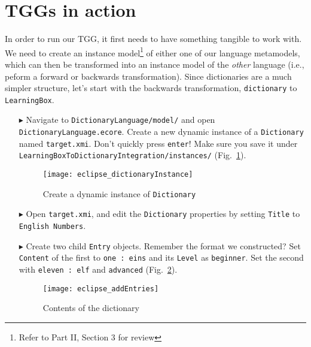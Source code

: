 \newpage
\section{TGGs in action}
\genHeader
\label{sect:TGGs_in_Action}

In order to run our TGG, it first needs to have something tangible to work with. We need to create an instance model\footnote{Refer to Part II, Section 3 for
review} of either one of our language metamodels, which can then be transformed into an instance model of the \emph{other} language (i.e., peform a forward or
backwards transformation). Since dictionaries are a much simpler structure, let's start with the backwards transformation, \texttt{dictionary} to
\texttt{LearningBox}.

\begin{itemize}

\item[$\blacktriangleright$] Navigate to \texttt{Dictionary\-Language/model/} and open \texttt{DictionaryLanguage.ecore}. Create a new
dynamic instance of a \texttt{Dictionary} named \texttt{target.xmi}. Don't quickly press \texttt{enter}! Make sure you save it under
\texttt{Learn\-ing\-Box\-To\-Dictionary\-In\-te\-gra\-tion/in\-stan\-ces/} (Fig.~\ref{fig:create_instance_dict}).

\begin{figure}[htbp]
\begin{center}
  \texttt{[image: eclipse\_dictionaryInstance]}
  \caption{Create a dynamic instance of \texttt{Dictionary}}
  \label{fig:create_instance_dict}
\end{center}
\end{figure}

\item[$\blacktriangleright$] Open \texttt{target.xmi}, and edit the \texttt{Dictionary} properties by setting \texttt{Title} to \texttt{English Numbers}.

\item[$\blacktriangleright$] Create two child \texttt{Entry} objects. Remember the format we constructed? Set \texttt{Content} of the first to \texttt{one :
eins} and its \texttt{Level} as \texttt{beginner}. Set the second with \texttt{eleven : elf} and \texttt{advanced} (Fig.~\ref{fig:dictionaryxmi}).

\begin{figure}[htbp]
\begin{center}
  \texttt{[image: eclipse\_addEntries]}
  \caption{Contents of the dictionary}
  \label{fig:dictionaryxmi}
\end{center}
\end{figure}


\end{itemize}
